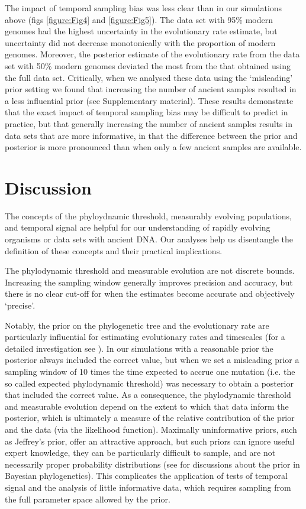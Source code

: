 \documentclass[11pt]{article}
\begin{document}
The impact of temporal sampling bias was less clear than in our simulations above (figs \ref{figure:Fig4} and \ref{figure:Fig5}). The data set with 95\% modern genomes had the highest uncertainty in the evolutionary rate estimate, but uncertainty did not decrease monotonically with the proportion of modern genomes. Moreover, the posterior estimate of the evolutionary rate from the data set with 50\% modern genomes deviated the most from the that obtained using the full data set. Critically, when we analysed these data using the `misleading' prior setting we found that increasing the number of ancient samples resulted in a less influential prior (see Supplementary material). These results demonstrate that the exact impact of temporal sampling bias may be difficult to predict in practice, but that generally increasing the number of ancient samples results in data sets that are more informative, in that the difference between the prior and posterior is more pronounced than when only a few ancient samples are available.

\section{Discussion}
The concepts of the phyloydnamic threshold, measurably evolving populations, and temporal signal are helpful for our understanding of rapidly evolving organisms or data sets with ancient DNA. Our analyses help us disentangle the definition of these concepts and their practical implications. 

The phylodynamic threshold and measurable evolution are not discrete bounds. Increasing the sampling window generally improves precision and accuracy, but there is no clear cut-off for when the estimates become accurate and objectively `precise'. 

Notably, the prior on the phylogenetic tree and the evolutionary rate are particularly influential for estimating evolutionary rates and timescales (for a detailed investigation see \cite{tay2024assessing}). In our simulations with a reasonable prior the posterior always included the correct value, but when we set a misleading prior a sampling window of 10 times the time expected to accrue one mutation (i.e. the so called expected phylodynamic threshold) was necessary to obtain a posterior that included the correct value. As a consequence, the phylodynamic threshold and measurable evolution depend on the extent to which that data inform the posterior, which is ultimately a measure of the relative contribution of the prior and the data (via the likelihood function). Maximally uninformative priors, such as Jeffrey's prior, offer an attractive approach, but such priors can ignore useful expert knowledge, they can be particularly difficult to sample, and are not necessarily proper probability distributions (see \citealt{baele2014bayesian, wang2014priors} for discussions about the prior in Bayesian phylogenetics). This complicates the application of tests of temporal signal \citep{duchene2020bayesian} and the analysis of little informative data, which requires sampling from the full parameter space allowed by the prior. 
\end{document}
